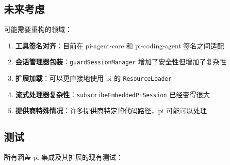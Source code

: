 \subsection{未来考虑}


可能需要重构的领域：

\begin{enumerate}
  \item \textbf{工具签名对齐}：目前在 pi-agent-core 和 pi-coding-agent 签名之间适配
  \item \textbf{会话管理器包装}：\texttt{guardSessionManager} 增加了安全性但增加了复杂性
  \item \textbf{扩展加载}：可以更直接地使用 pi 的 \texttt{ResourceLoader}
  \item \textbf{流式处理器复杂性}：\texttt{subscribeEmbeddedPiSession} 已经变得很大
  \item \textbf{提供商特殊情况}：许多提供商特定的代码路径，pi 可能可以处理
\end{enumerate}


\subsection{测试}


所有涵盖 pi 集成及其扩展的现有测试：

